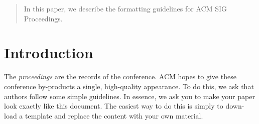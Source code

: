 \documentclass{sig-alternate-br}
\begin{document}
%
\author{
%
%
\alignauthor
Alexandru-Ionut Imbrea\\
       \\
       \\
       \\
}
\date{30 July 1999}

\maketitle
\begin{abstract}
In this paper, we describe the formatting guidelines for ACM SIG Proceedings.  
\end{abstract}



\section{Introduction}
The \textit{proceedings} are the records of the conference. ACM 
hopes to give these conference by-products a single, high-quality
appearance. To do this, we ask that authors follow some simple 
guidelines. In essence, we ask you to make your paper look exactly 
like this document. The easiest way to do this is simply to down-load 
a template and replace the content with your own material. 
\end{document}
